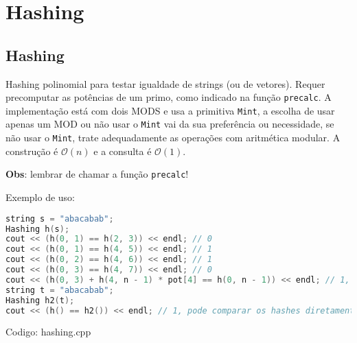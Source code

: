\documentclass[10pt, a4paper, oneside]{book}
\begin{document}
\section{Hashing}
\subsection{Hashing}


Hashing polinomial para testar igualdade de strings (ou de vetores). Requer precomputar as potências de um primo, como indicado na função \texttt{precalc}. A implementação está com dois MODS e usa a primitiva \texttt{Mint}, a escolha de usar apenas um MOD ou não usar o \texttt{Mint} vai da sua preferência ou necessidade, se não usar o \texttt{Mint}, trate adequadamente as operações com aritmética modular. A construção é $\mathcal{O}(n)$ e a consulta é $\mathcal{O}(1)$.



\textbf{Obs}: lembrar de chamar a função \texttt{precalc}!



Exemplo de uso:



\begin{lstlisting}[language=C++]
string s = "abacabab";
Hashing h(s);
cout << (h(0, 1) == h(2, 3)) << endl; // 0
cout << (h(0, 1) == h(4, 5)) << endl; // 1
cout << (h(0, 2) == h(4, 6)) << endl; // 1
cout << (h(0, 3) == h(4, 7)) << endl; // 0
cout << (h(0, 3) + h(4, n - 1) * pot[4] == h(0, n - 1)) << endl; // 1, da pra shiftar o hash
string t = "abacabab";
Hashing h2(t);
cout << (h() == h2()) << endl; // 1, pode comparar os hashes diretamente
\end{lstlisting}

\hfill

Codigo: hashing.cpp
\end{document}
